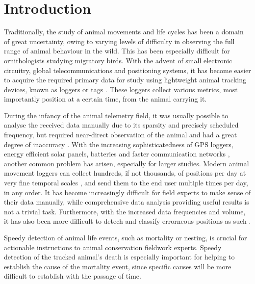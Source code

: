 \chapter*{Introduction}

Traditionally, the study of animal movements and life cycles has been a domain of great uncertainty, owing to varying levels of difficulty in observing the full range of animal behaviour in the wild. This has been especially difficult for ornithologists studying migratory birds. With the advent of small electronic circuitry, global telecommunications and positioning systems, it has become easier to acquire the required primary data for study using lightweight animal tracking devices, known as loggers or tags \cite{kays2015terrestrial}. These loggers collect various metrics, most importantly position at a certain time, from the animal carrying it.

During the infancy of the animal telemetry field, it was usually possible to analyse the received data manually due to its sparsity and precisely scheduled frequency, but required near-direct observation of the animal and had a great degree of inaccuracy \cite{burger2008perspectives}. With the increasing sophisticatedness of GPS loggers, energy efficient solar panels, batteries and faster communication networks \cite{kays2015terrestrial}, another common problem has arisen, especially for larger studies. Modern animal movement loggers can collect hundreds, if not thousands, of positions per day at very fine temporal scales \cite{gupte2022guide}, and send them to the end user multiple times per day, in any order. It has become increasingly difficult for field experts to make sense of their data manually, while comprehensive data analysis providing useful results is not a trivial task. Furthermore, with the increased data frequencies and volume, it has also been more difficult to detech and classify errorneous positions as such \cite{gupte2022guide}. 

Speedy detection of animal life events, such as mortality or nesting, is crucial for actionable instructions to animal conservation fieldwork experts. Speedy detection of the tracked animal's death is especially important for helping to establish the cause of the mortality event, since specific causes will be more difficult to establish with the passage of time.

